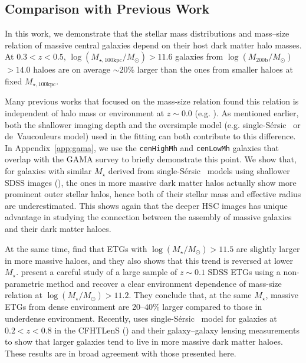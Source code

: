 \documentclass[a4paper,fleqn,usenatbib]{mnras}
\def\ser{{S\'{e}rsic\ }}
\def\rbcg{\texttt{cenHighMh}}
\def\nbcg{\texttt{cenLowMh}}
\def\mstar{{$M_{\star}$}}
\def\logms{{$\log (M_{\star}/M_{\odot})$}}
\def\logmhalo{{$\log (M_{\mathrm{200b}}/M_{\odot})$}}
\def\mtot{{$M_{\star,100\mathrm{kpc}}$}}
\def\logmtot{{$\log (M_{\star,100\mathrm{kpc}}/M_{\odot})$}}
\begin{document}

\subsection{Comparison with Previous Work} 

    In this work, we demonstrate that the stellar mass distributions and mass--size 
    relation of massive central galaxies depend on their host dark matter halo masses. 
    At $0.3 < z < 0.5$, \logmtot{}$>11.6$ galaxies from \logmhalo{}$>14.0$ haloes 
    are on average $\sim20$\% larger than the ones from smaller haloes at fixed 
    \mtot{}.
    
    Many previous works that focused on the mass-size relation found this relation 
    is independent of halo mass or environment at $z\sim 0.0$ 
    (e.g. \citealt{Nair2010, Maltby2010, Cappellari2013, HCompany13}). 
    As mentioned earlier, both the shallower imaging depth and the oversimple model 
    (e.g. single-\ser{} or de~Vaucouleurs model) used in the fitting can both 
    contribute to this difference.
    In Appendix~\ref{app:gama}, we use the \rbcg{} and \nbcg{} galaxies that overlap 
    with the GAMA survey to briefly demonstrate this point. 
    We show that, for galaxies with similar \mstar{} derived from single-\ser{} 
    models using shallower SDSS images (\citealt{Kelvin2012}), the ones in more 
    massive dark matter halos actually show more prominent outer stellar halos, 
    hence both of their stellar mass and effective radius are underestimated.  
    This shows again that the deeper HSC images has unique advantage in studying 
    the connection between the assembly of massive galaxies and their dark matter 
    haloes. 
         
    At the same time, \citet{Cerbrian2014} find that ETGs with \logms{}$>11.5$ are 
    slightly larger in more massive haloes, and they also shows that this trend is 
    reversed at lower \mstar{}. 
    \citet{Yoon2017} present a careful study of a large sample of $z\sim0.1$ SDSS ETGs 
    using a non-parametric method and recover a clear environment dependence of 
    mass-size relation at \logms{}$>11.2$. 
    They conclude that, at the same \mstar{}, massive ETGs from dense environment 
    are 20--40\% larger compared to those in underdense environment.
    Recently, \citet{Charlton2017} uses single-\ser{} model for galaxies at 
    $0.2 < z < 0.8$ in the CFHTLenS (\citealt{Heymans2012}) and their galaxy--galaxy 
    lensing measurements to show that larger galaxies tend to live in more massive 
    dark matter haloes.
    These results are in broad agreement with those presented here.
    
\end{document}
